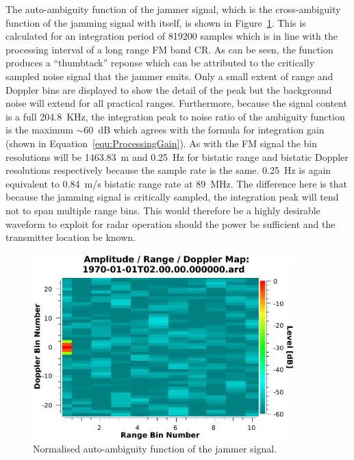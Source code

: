 \documentclass[english, 12pt]{report}
\begin{document}
The auto-ambiguity function of the jammer signal, which is the cross-ambiguity function of the jamming signal with itself, is shown in Figure~\ref{fig:JammerAAF}. This is calculated for an integration period of 819200 samples which is in line with the processing interval of a long range FM band CR. As can be seen, the function produces a ``thumbtack'' reponse which can be attributed to the critically sampled noise signal that the jammer emits. Only a small extent of range and Doppler bins are displayed to show the detail of the peak but the background noise will extend for all practical ranges. Furthermore, because the signal content is a full 204.8~KHz, the integration peak to noise ratio of the ambiguity function is the maximum $\sim$60~dB which agrees with the formula for integration gain (shown in Equation~\ref{equ:ProcessingGain}). As with the FM signal the bin resolutions will be 1463.83~m and 0.25~Hz for bistatic range and bistatic Doppler resolutions respectively because the sample rate is the same. 0.25~Hz is again equivalent to 0.84~m/s bistatic range rate at 89~MHz. The difference here is that because the jamming signal is critically sampled, the integration peak will tend not to span multiple range bins. This would therefore be a highly desirable waveform to exploit for radar operation should the power be sufficient and the transmitter location be known.

\begin{figure}[htbp]
\begin{center}
\includegraphics[width=0.9\textwidth]{figs/Simulations/JammerAAF.pdf}
\caption{Normalised auto-ambiguity function of the jammer signal.}
\label{fig:JammerAAF}
\end{center}
\end{figure}
\end{document}
